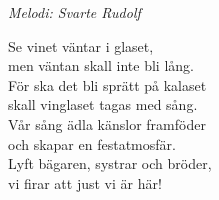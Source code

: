 {\footnotesize\textit{Melodi: Svarte Rudolf}}\par
\vspace{10pt}
Se vinet väntar i glaset,\\
men väntan skall inte bli lång.\\
För ska det bli sprätt på kalaset\\
skall vinglaset tagas med sång.\\
Vår sång ädla känslor framföder\\
och skapar en festatmosfär.\\
Lyft bägaren, systrar och bröder,\\
vi firar att just vi är här!
